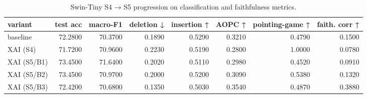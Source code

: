 \begin{table}[t]
\centering
\caption{Swin-Tiny S4 → S5 progression on classification and faithfulness metrics.}
\label{tab:swinprog}
\begin{tabular}{lrrrrrrr}
\toprule
variant & test acc & macro-F1 & deletion ↓ & insertion ↑ & AOPC ↑ & pointing-game ↑ & faith. corr ↑ \\
\midrule
baseline & 72.2800 & 70.3700 & 0.1890 & 0.5290 & 0.3210 & 0.4790 & 0.1500 \\
XAI (S4) & 71.7200 & 70.9600 & 0.2230 & 0.5190 & 0.2800 & 1.0000 & 0.0780 \\
XAI (S5/B1) & 73.4500 & 71.6400 & 0.2020 & 0.5110 & 0.2980 & 0.4520 & 0.0910 \\
XAI (S5/B2) & 73.4500 & 70.9700 & 0.2000 & 0.5200 & 0.3090 & 0.5380 & 0.1320 \\
XAI (S5/B3) & 72.4200 & 70.6800 & 0.1350 & 0.5030 & 0.3540 & 0.4870 & 0.3880 \\
\bottomrule
\end{tabular}
\end{table}
